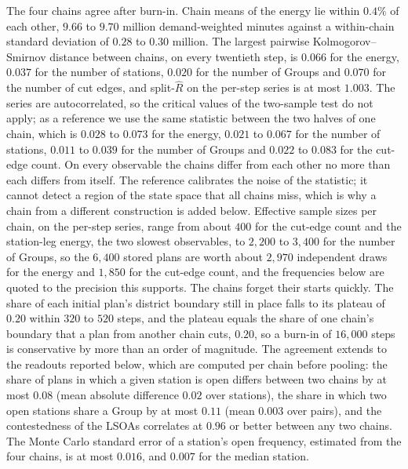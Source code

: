 \documentclass[preprint,12pt,authoryear]{elsarticle}
\theoremstyle{definition}
\begin{document}
The four chains agree after burn-in. Chain means of the energy lie within $0.4\%$ of each other, $9.66$ to $9.70$ million demand-weighted minutes against a within-chain standard deviation of $0.28$ to $0.30$ million. The largest pairwise Kolmogorov--Smirnov distance between chains, on every twentieth step, is $0.066$ for the energy, $0.037$ for the number of stations, $0.020$ for the number of Groups and $0.070$ for the number of cut edges, and split-$\hat R$ on the per-step series is at most $1.003$. The series are autocorrelated, so the critical values of the two-sample test do not apply; as a reference we use the same statistic between the two halves of one chain, which is $0.028$ to $0.073$ for the energy, $0.021$ to $0.067$ for the number of stations, $0.011$ to $0.039$ for the number of Groups and $0.022$ to $0.083$ for the cut-edge count. On every observable the chains differ from each other no more than each differs from itself. The reference calibrates the noise of the statistic; it cannot detect a region of the state space that all chains miss, which is why a chain from a different construction is added below. Effective sample sizes per chain, on the per-step series, range from about $400$ for the cut-edge count and the station-leg energy, the two slowest observables, to $2{,}200$ to $3{,}400$ for the number of Groups, so the $6{,}400$ stored plans are worth about $2{,}970$ independent draws for the energy and $1{,}850$ for the cut-edge count, and the frequencies below are quoted to the precision this supports. The chains forget their starts quickly. The share of each initial plan's district boundary still in place falls to its plateau of $0.20$ within $320$ to $520$ steps, and the plateau equals the share of one chain's boundary that a plan from another chain cuts, $0.20$, so a burn-in of $16{,}000$ steps is conservative by more than an order of magnitude. The agreement extends to the readouts reported below, which are computed per chain before pooling: the share of plans in which a given station is open differs between two chains by at most $0.08$ (mean absolute difference $0.02$ over stations), the share in which two open stations share a Group by at most $0.11$ (mean $0.003$ over pairs), and the contestedness of the LSOAs correlates at $0.96$ or better between any two chains. The Monte Carlo standard error of a station's open frequency, estimated from the four chains, is at most $0.016$, and $0.007$ for the median station.
\end{document}
